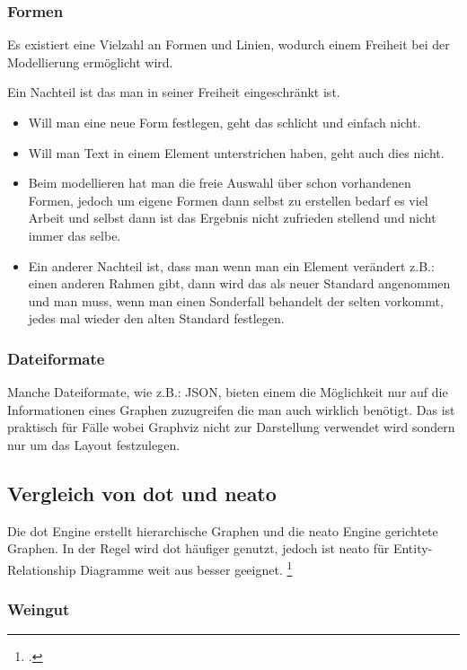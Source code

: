 \subsubsection{Formen}
\noindent
Es existiert eine Vielzahl an Formen und Linien, wodurch einem Freiheit bei der Modellierung ermöglicht wird.

\noindent
Ein Nachteil ist das man in seiner Freiheit eingeschränkt ist.
\begin{itemize}
	\item Will man eine neue Form festlegen, geht das schlicht und einfach nicht.
	\item Will man Text in einem Element unterstrichen haben, geht auch dies nicht.
	\item Beim modellieren hat man die freie Auswahl über schon vorhandenen Formen, jedoch um eigene Formen dann selbst zu erstellen bedarf es viel Arbeit und selbst dann ist das Ergebnis nicht zufrieden stellend und nicht immer das selbe.
	\item Ein anderer Nachteil ist, dass man wenn man ein Element verändert z.B.: einen anderen Rahmen gibt, dann wird das als neuer Standard angenommen und man muss, wenn man einen Sonderfall behandelt der selten vorkommt, jedes mal wieder den alten Standard festlegen.
\end{itemize}


\subsubsection{Dateiformate}
\noindent
Manche Dateiformate, wie z.B.: JSON, bieten einem die Möglichkeit nur auf die Informationen eines Graphen zuzugreifen die man auch wirklich benötigt. Das ist praktisch für Fälle wobei Graphviz nicht zur Darstellung verwendet wird sondern nur um das Layout festzulegen. 

\subsection{Vergleich von dot und neato}
\fib{}
\noindent
Die dot Engine erstellt hierarchische Graphen und die neato Engine gerichtete Graphen.
In der Regel wird dot häufiger genutzt, jedoch ist neato für Entity-Relationship Diagramme weit aus besser geeignet.
\footcite{graphviz_neato}

\subsubsection{Weingut}

